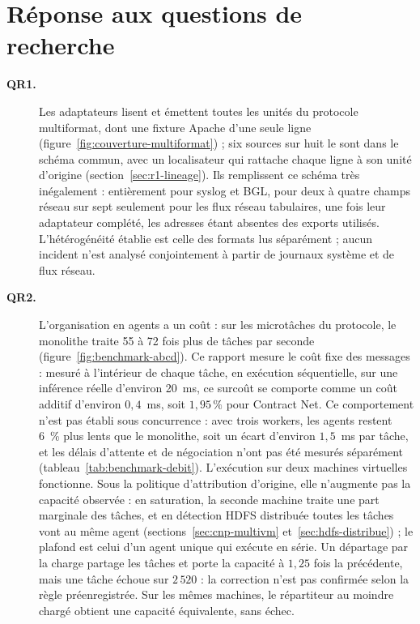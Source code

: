 \section*{Réponse aux questions de recherche}

\begin{description}

    \item[\textbf{QR1.}]
    Les adaptateurs lisent et émettent toutes les unités du protocole multiformat, dont une fixture Apache d'une seule ligne (figure~\ref{fig:couverture-multiformat}) ; six sources sur huit le sont dans le schéma commun, avec un localisateur qui rattache chaque ligne à son unité d'origine (section~\ref{sec:r1-lineage}). Ils remplissent ce schéma très inégalement : entièrement pour syslog et BGL, pour deux à quatre champs réseau sur sept seulement pour les flux réseau tabulaires, une fois leur adaptateur complété, les adresses étant absentes des exports utilisés. L'hétérogénéité établie est celle des formats lus séparément ; aucun incident n'est analysé conjointement à partir de journaux système et de flux réseau.

    \item[\textbf{QR2.}]
    L'organisation en agents a un coût : sur les microtâches du protocole, le monolithe traite 55 à 72 fois plus de tâches par seconde (figure~\ref{fig:benchmark-abcd}). Ce rapport mesure le coût fixe des messages : mesuré à l'intérieur de chaque tâche, en exécution séquentielle, sur une inférence réelle d'environ 20~ms, ce surcoût se comporte comme un coût additif d'environ $0{,}4$~ms, soit $1{,}95\,\%$ pour Contract Net. Ce comportement n'est pas établi sous concurrence : avec trois workers, les agents restent 6~\% plus lents que le monolithe, soit un écart d'environ $1{,}5$~ms par tâche, et les délais d'attente et de négociation n'ont pas été mesurés séparément (tableau~\ref{tab:benchmark-debit}). L'exécution sur deux machines virtuelles fonctionne. Sous la politique d'attribution d'origine, elle n'augmente pas la capacité observée : en saturation, la seconde machine traite une part marginale des tâches, et en détection HDFS distribuée toutes les tâches vont au même agent (sections~\ref{sec:cnp-multivm} et~\ref{sec:hdfs-distribue}) ; le plafond est celui d'un agent unique qui exécute en série. Un départage par la charge partage les tâches et porte la capacité à $1{,}25$ fois la précédente, mais une tâche échoue sur $2\,520$ : la correction n'est pas confirmée selon la règle préenregistrée. Sur les mêmes machines, le répartiteur au moindre chargé obtient une capacité équivalente, sans échec.


\end{description}
